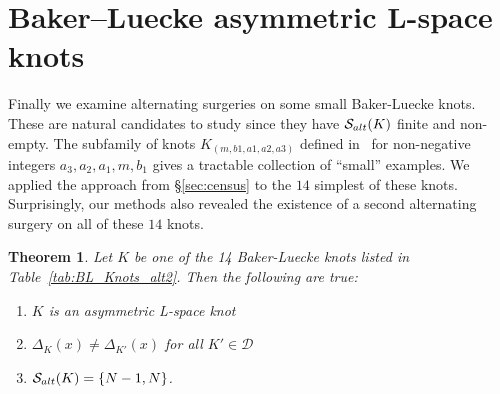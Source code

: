 \documentclass{amsart} %
\newcommand{\D}{\mathcal{D}}
\newcommand{\Salt}{\mathcal{S}_{\rm alt}}
\theoremstyle{thm}
\newtheorem{thm}[Theorem]{Theorem}
\theoremstyle{definition}
\numberwithin{equation}{section}
\begin{document}
\section{Baker--Luecke asymmetric L-space knots}\label{sec:Baker_Luecke}
Finally we examine alternating surgeries on some small Baker-Luecke knots. These are natural candidates to study since they have $\Salt(K)$ finite and non-empty. The subfamily of knots $K_{(m,b1,a1,a2,a3)}$ defined in~\cite[\S 11.4]{BL17} for non-negative integers $a_3, a_2, a_1, m, b_1$ gives a tractable collection of ``small'' examples. We applied the approach from \S\ref{sec:census} to the $14$ simplest of these knots. Surprisingly, our methods also revealed the existence of a second alternating surgery on all of these $14$ knots. 
\begin{thm} \label{thm:BLaltsurgs}
Let $K$ be one of the 14 Baker-Luecke knots listed in Table~\ref{tab:BL_Knots_alt2}. Then the following are true:
\begin{enumerate}
    \item $K$ is an asymmetric L-space knot
    \item  $\Delta_K(x)\neq \Delta_{K'}(x)$ for all $K'\in \D$
    \item $\Salt(K)=\{N-1,N\}$.
\end{enumerate}
\end{thm}
\end{document}
